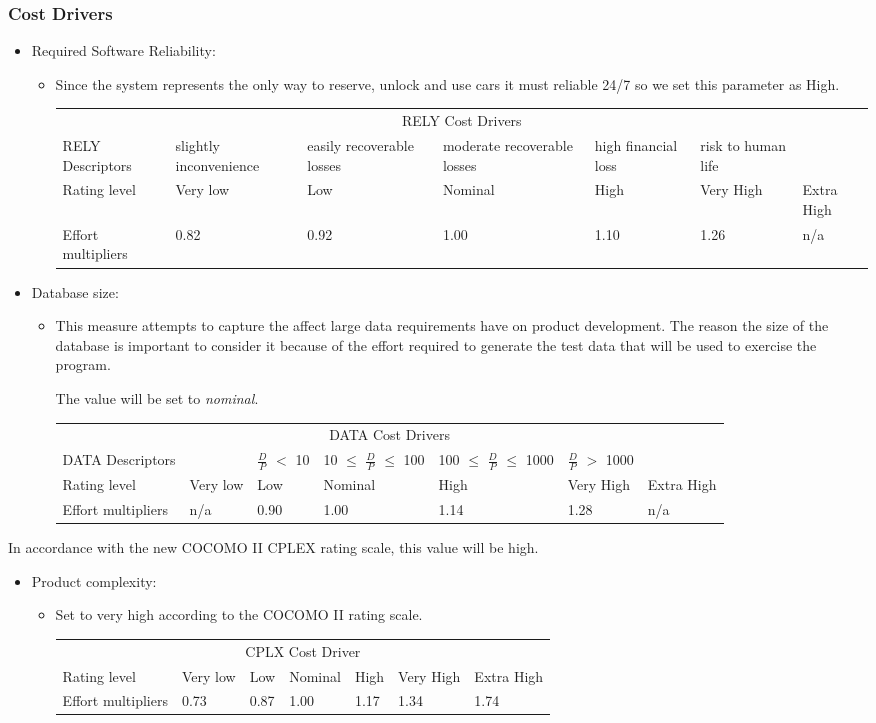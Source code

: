 \documentclass[english]{article}
\newenvironment{costdriverstable}[1]{
	\setlength{\LTleft}{-40pt}
	\begin{longtable}{|p{\dimexpr.16\textwidth}|p{\dimexpr.14\textwidth}|p{\dimexpr.14\textwidth}|p{\dimexpr.14\textwidth}|p{\dimexpr.14\textwidth}|p{\dimexpr.14\textwidth}|p{\dimexpr.14\textwidth}|}
	\hline
	\multicolumn{7}{|c|}{{#1}}\\\hhline{|=======|}
}{
	\hline\end{longtable}
}
\newcommand{\costdescriptors}[7]{
	#1 & #2 & #3 & #4 & #5 & #6 & #7\\
}
\newcommand{\ratinglevel}[6]{
	Rating level & #1 & #2 & #3 & #4 & #5 & #6 \\\hline
}
\newcommand{\effortmultipliers}[6]{
	Effort multipliers & #1 & #2 & #3 & #4 & #5 & #6 \\\hline
}
\begin{document}
\subsubsection{Cost Drivers}
\begin{itemize}
	\item  Required Software Reliability:
	\begin{itemize}
	\item[] Since the system represents the only way to reserve, unlock and use cars it must reliable 24/7 so we set this parameter as High.
	\pagebreak
	\begin{costdriverstable}{RELY Cost Drivers}
		\costdescriptors{RELY Descriptors}{slightly inconvenience}{easily recoverable losses}{moderate recoverable losses}{high financial loss}{risk to human life}{}\hline
		\ratinglevel{Very low}{Low}{Nominal}{High}{Very High}{Extra High}
		\effortmultipliers{0.82}{0.92}{1.00}{1.10}{1.26}{n/a}
	\end{costdriverstable}
	\end{itemize}
\end{itemize}

\begin{itemize}
	\item Database size:
	\begin{itemize}
	\item[] This measure attempts to capture the affect large data requirements have on product development. The reason the size of the database is important to consider it because of the effort required to generate the test data that will be used to exercise
the program. \par The value will be set to \textit{nominal}.
	\begin{costdriverstable}{DATA Cost Drivers}
		\costdescriptors{DATA Descriptors}{}{$\frac{D}{P}$ $<$ 10}{10 $\le$ $\frac{D}{P}$ $\le$ 100}{100 $\le$ $\frac{D}{P}$ $\le$ 1000}{$\frac{D}{P}$ $>$ 1000}{}\hline
		\ratinglevel{Very low}{Low}{Nominal}{High}{Very High}{Extra High}
		\effortmultipliers{n/a}{0.90}{1.00}{1.14}{1.28}{n/a}
	\end{costdriverstable}
	\end{itemize}
\end{itemize}
In accordance with the new COCOMO II CPLEX rating scale, this value will be high.
\begin{itemize}
	\item Product complexity: 
	\begin{itemize}
	\item[] Set to very high according to the COCOMO II rating scale.
	\begin{costdriverstable}{CPLX Cost Driver}
		\ratinglevel{Very low}{Low}{Nominal}{High}{Very High}{Extra High}
		\effortmultipliers{0.73}{0.87}{1.00}{1.17}{1.34}{1.74}	
	\end{costdriverstable}
	\end{itemize}
\end{itemize}
\end{document}
